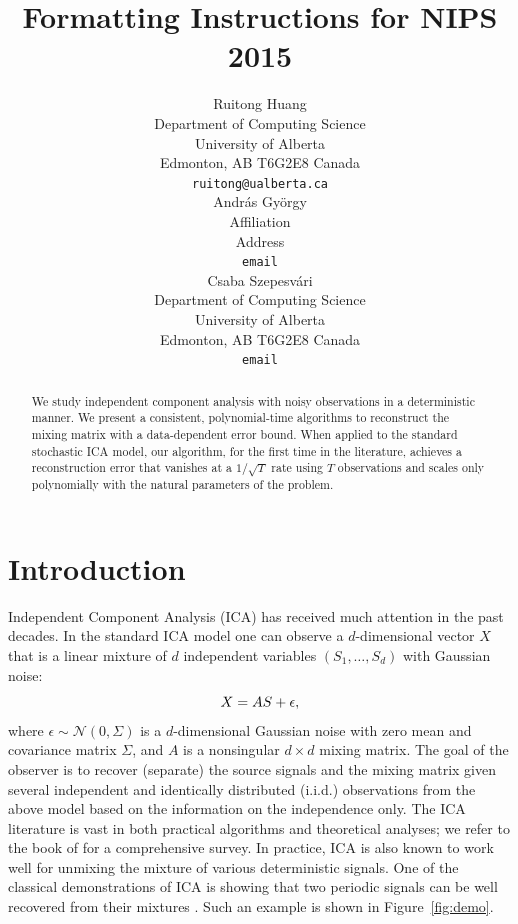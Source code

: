 \documentclass{article} %
\title{Formatting Instructions for NIPS 2015}
\author{
Ruitong Huang \\
Department of Computing Science\\
University of Alberta \\
Edmonton, AB T6G2E8 Canada\\
\texttt{ruitong@ualberta.ca} \\
\And
Andr\'as Gy\"orgy \\
Affiliation \\
Address \\
\texttt{email} \\
\And
Csaba Szepesv\'ari \\
Department of Computing Science\\
University of Alberta \\
Edmonton, AB T6G2E8 Canada\\
\texttt{email}
}
\newcommand{\iid}{i.i.d.\xspace}
\theoremstyle{definition}
\begin{document}
\maketitle

\begin{abstract}
We study independent component analysis with noisy observations in a deterministic manner. We present a consistent, polynomial-time algorithms to reconstruct the mixing matrix with a data-dependent error bound. 
When applied to the standard stochastic ICA model, 
our algorithm, for the first time in the literature, achieves a reconstruction error that vanishes at a $1/\sqrt{T}$ rate using $T$ observations and scales only polynomially with the natural parameters of the problem.  
\end{abstract}

\section{Introduction}
Independent Component Analysis (ICA)
has received much attention in the past decades. 
In the standard ICA model one can observe a $d$-dimensional vector $X$ that is a linear mixture of $d$ independent variables $(S_1,\ldots, S_d)$ with Gaussian noise:
\vspace{-2mm}
\begin{equation}
\label{eq:stoch-ICA}
X = AS+\epsilon,
\vspace{-2mm}
\end{equation}
where $\epsilon \sim \mathcal{N}(0,\Sigma)$ is a $d$-dimensional Gaussian noise with zero mean and covariance matrix $\Sigma$, and $A$ is a nonsingular $d \times d$ mixing matrix. 
The goal of the observer is to recover (separate) the source signals and the mixing matrix given several independent and identically distributed (\iid) observations from the above model based on the information on the independence only.
The ICA literature is vast in both practical algorithms and theoretical analyses; 
we refer to the book of \citet{comon2010handbook} for a comprehensive survey.
In practice, ICA is also known to work well for unmixing the mixture of various deterministic signals. 
One of the classical demonstrations of ICA is showing that two periodic signals can be well recovered from their mixtures \citep{HyvOja00}.
Such an example is shown in Figure~\ref{fig:demo}. 
\end{document}
